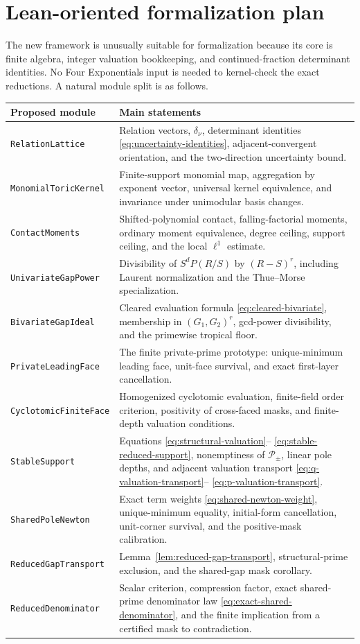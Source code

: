 \documentclass[11pt,oneside]{article}
\theoremstyle{definition}
\theoremstyle{remark}
\begin{document}
\section{Lean-oriented formalization plan}
\label{sec:lean-plan}

The new framework is unusually suitable for formalization because its core is finite algebra,
integer valuation bookkeeping, and continued-fraction determinant identities.  No Four
Exponentials input is needed to kernel-check the exact reductions.  A natural module split is
as follows.

\begin{longtable}{>{\raggedright\arraybackslash}p{}>{\raggedright\arraybackslash}p{}}
\toprule
Proposed module & Main statements \\
\midrule
\endhead
\texttt{RelationLattice} & Relation vectors, $\delta_\nu$, determinant identities
\eqref{eq:uncertainty-identities}, adjacent-convergent orientation, and the two-direction
uncertainty bound. \\
\texttt{MonomialToricKernel} & Finite-support monomial map, aggregation by exponent vector,
universal kernel equivalence, and invariance under unimodular basis changes. \\
\texttt{ContactMoments} & Shifted-polynomial contact, falling-factorial moments, ordinary
moment equivalence, degree ceiling, support ceiling, and the local $\ell^1$ estimate. \\
\texttt{UnivariateGapPower} & Divisibility of $S^dP(R/S)$ by $(R-S)^r$, including Laurent
normalization and the Thue--Morse specialization. \\
\texttt{BivariateGapIdeal} & Cleared evaluation formula \eqref{eq:cleared-bivariate},
membership in $(G_1,G_2)^r$, gcd-power divisibility, and the primewise tropical floor. \\
\texttt{PrivateLeadingFace} & The finite private-prime prototype: unique-minimum leading
face, unit-face survival, and exact first-layer cancellation. \\
\texttt{CyclotomicFiniteFace} & Homogenized cyclotomic evaluation, finite-field order
criterion, positivity of cross-faced masks, and finite-depth valuation conditions. \\
\texttt{StableSupport} & Equations \eqref{eq:structural-valuation}--
\eqref{eq:stable-reduced-support}, nonemptiness of $\mathcal P_\pm$, linear pole depths, and
adjacent valuation transport \eqref{eq:q-valuation-transport}--
\eqref{eq:p-valuation-transport}. \\
\texttt{SharedPoleNewton} & Exact term weights \eqref{eq:shared-newton-weight}, unique-minimum
equality, initial-form cancellation, unit-corner survival, and the positive-mask calibration.
\\
\texttt{ReducedGapTransport} & Lemma~\ref{lem:reduced-gap-transport}, structural-prime
exclusion, and the shared-gap mask corollary. \\
\texttt{ReducedDenominator} & Scalar criterion, compression factor, exact
shared-prime denominator law \eqref{eq:exact-shared-denominator}, and the finite implication
from a certified mask to contradiction. \\
\bottomrule
\end{longtable}
\end{document}
